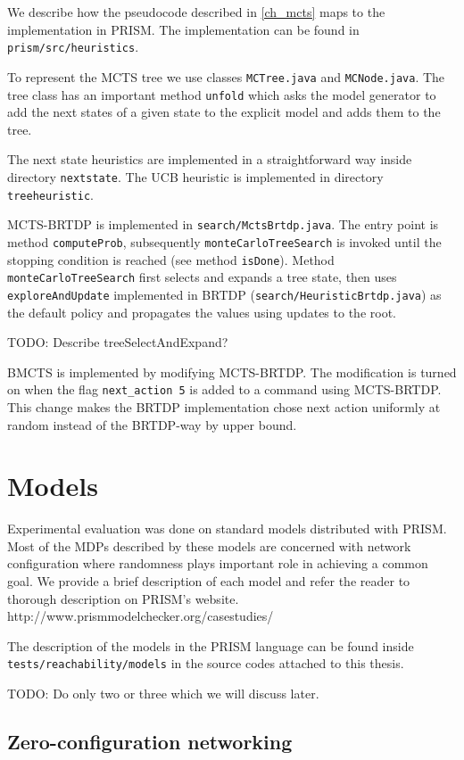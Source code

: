 We describe how the pseudocode described in \autoref{ch_mcts} maps to
the implementation in PRISM. The implementation can be found in
\verb|prism/src/heuristics|.

To represent the MCTS tree we use classes \verb|MCTree.java| and
\linebreak
\verb|MCNode.java|. The tree class has an important method \verb|unfold|
which asks the model generator to add the next states of a given state
to the explicit model and adds them to the tree.

The next state heuristics are implemented in a straightforward way
inside directory \verb|nextstate|. The UCB heuristic is implemented in
directory \verb|treeheuristic|.

MCTS-BRTDP is implemented in \verb|search/MctsBrtdp.java|. The entry
point is method \verb|computeProb|, subsequently
\verb|monteCarloTreeSearch| is invoked until the stopping condition
is reached (see method \verb|isDone|). Method
\verb|monteCarloTreeSearch| first selects and expands a tree state,
then uses \verb|exploreAndUpdate| implemented in BRTDP
(\verb|search/HeuristicBrtdp.java|) as the default policy and propagates
the values using updates to the root.

TODO: Describe treeSelectAndExpand?

BMCTS is implemented by modifying MCTS-BRTDP. The modification is turned
on when the flag \verb|next_action 5| is added to a command using
MCTS-BRTDP. This change makes the BRTDP implementation chose next action
uniformly at random instead of the BRTDP-way by upper bound.

\section{Models}

Experimental evaluation was done on standard models
distributed with PRISM. Most of the MDPs described by these models are
concerned with network configuration where randomness plays important
role in achieving a common goal. We provide a brief description of each
model and refer the reader to thorough description on PRISM's website.
http://www.prismmodelchecker.org/casestudies/

The description of the models in the PRISM language can be found inside
\verb|tests/reachability/models| in the source codes attached to this
thesis.

TODO: Do only two or three which we will discuss later.

\subsection*{Zero-configuration networking}


